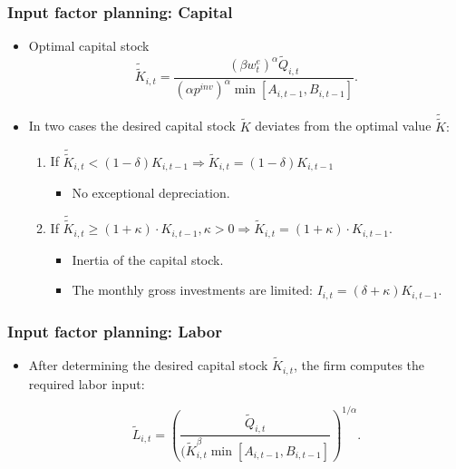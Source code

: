 \documentclass{beamer}
\begin{document}
\frame
{

  \frametitle{Input factor planning: Capital} 
\begin{itemize}

\item Optimal capital stock 
\[
\tilde {\tilde K}_{i,t}= \frac{(\beta w_t^e)^{\alpha} \tilde
Q_{i,t}}{(\alpha p^{inv})^{\alpha} \min [A_{i,t-1}, B_{i,t-1}]}.
\]

\item In two cases the desired capital stock $\tilde{K}$ deviates from the optimal value $\tilde {\tilde K}:$ 

 
\begin{enumerate}
	\item If $\tilde {\tilde K}_{i,t} < (1- \delta) K_{i,t-1} \Rightarrow \tilde{K}_{i,t}= (1- \delta) K_{i,t-1}$
\begin{itemize}
	\item  No exceptional depreciation.
\end{itemize}
	
	\item If $\tilde {\tilde K}_{i,t} \geq (1+\kappa) \cdot K_{i,t-1}, \kappa > 0 \Rightarrow  {\tilde K}_{i,t} = (1+\kappa)  \cdot K_{i,t-1}$.
	
	
\begin{itemize}
	\item Inertia of the capital stock.
	\item The monthly gross investments are limited: $I_{i,t}= (\delta + \kappa)K_{i,t-1}$.
\end{itemize}	
	 
\end{enumerate}

 
	
\end{itemize}

}



\frame
{

  \frametitle{Input factor planning: Labor} 
\begin{itemize}

\item After determining the desired capital stock $\tilde{K}_{i,t}$, the firm computes the required labor input:	

\[
{\tilde L}_{i,t} = \left( \frac{\tilde Q_{i,t}}{(\tilde{K}_{i,t}^{\beta} \min [A_{i,t-1}, B_{i,t-1}]} \right)^{1/\alpha}.
\]	
	
\end{itemize}

}
\end{document}
